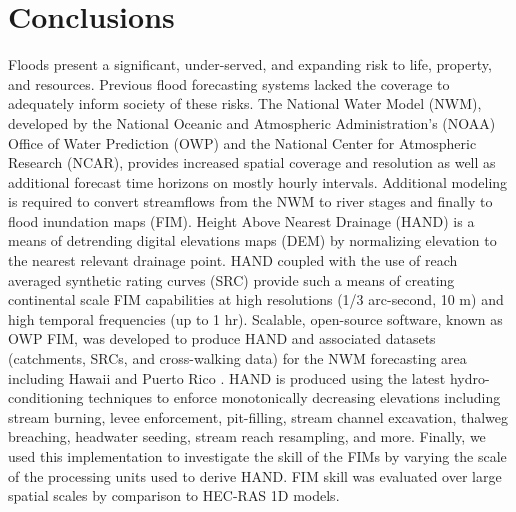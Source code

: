 \documentclass[draft]{dependencies/agujournal2019}
\begin{document}
\section{Conclusions}
\label{sec:conclusions}
%
Floods present a significant, under-served, and expanding risk to life, property, and resources.
Previous flood forecasting systems lacked the coverage to adequately inform society of these risks.
The National Water Model (NWM), developed by the National Oceanic and Atmospheric Administration's (NOAA) Office of Water Prediction (OWP) and the National Center for Atmospheric Research (NCAR), provides increased spatial coverage and resolution as well as additional forecast time horizons on mostly hourly intervals.
Additional modeling is required to convert streamflows from the NWM to river stages and finally to flood inundation maps (FIM).
Height Above Nearest Drainage (HAND) is a means of detrending digital elevations maps (DEM) by normalizing elevation to the nearest relevant drainage point.
HAND coupled with the use of reach averaged synthetic rating curves (SRC) provide such a means of creating continental scale FIM capabilities at high resolutions (1/3 arc-second, 10 m) and high temporal frequencies (up to 1 hr).
Scalable, open-source software, known as OWP FIM, was developed to produce HAND and associated datasets (catchments, SRCs, and cross-walking data) for the NWM forecasting area including Hawaii and Puerto Rico \cite{inundationMapping2022}.
HAND is produced using the latest hydro-conditioning techniques to enforce monotonically decreasing elevations including stream burning, levee enforcement, pit-filling, stream channel excavation, thalweg breaching, headwater seeding, stream reach resampling, and more. 
Finally, we used this implementation to investigate the skill of the FIMs by varying the scale of the processing units used to derive HAND.
FIM skill was evaluated over large spatial scales by comparison to HEC-RAS 1D models.
\end{document}
